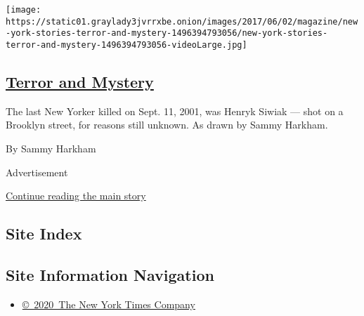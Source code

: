 \begin{enumerate}
  \texttt{[image: https://static01.graylady3jvrrxbe.onion/images/2017/06/02/magazine/new-york-stories-terror-and-mystery-1496394793056/new-york-stories-terror-and-mystery-1496394793056-videoLarge.jpg]}

  \hypertarget{terror-and-mystery}{%
  \subsection{\texorpdfstring{\href{/interactive/2017/06/02/magazine/new-york-stories-terror-and-mystery.html}{Terror
  and Mystery}}{Terror and Mystery}}\label{terror-and-mystery}}

  The last New Yorker killed on Sept. 11, 2001, was Henryk Siwiak ---
  shot on a Brooklyn street, for reasons still unknown. As drawn by
  Sammy Harkham.

  By Sammy Harkham
\end{enumerate}

Advertisement

\protect\hyperlink{after-mid1}{Continue reading the main story}

\hypertarget{site-index}{%
\subsection{Site Index}\label{site-index}}

\hypertarget{site-information-navigation}{%
\subsection{Site Information
Navigation}\label{site-information-navigation}}

\begin{itemize}
\tightlist
\item
  \href{https://help.nytimes3xbfgragh.onion/hc/en-us/articles/115014792127-Copyright-notice}{©~2020~The
  New York Times Company}
\end{itemize}

